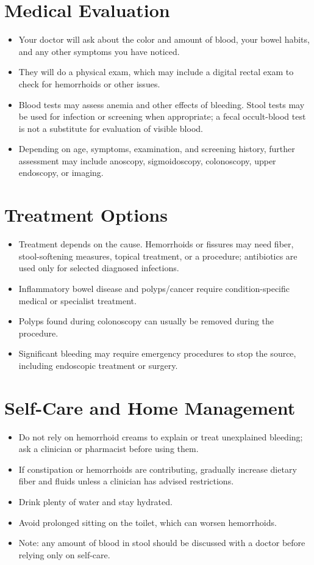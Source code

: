 \section*{Medical Evaluation}
\begin{itemize}
  \item Your doctor will ask about the color and amount of blood, your bowel habits, and any other symptoms you have noticed.
  \item They will do a physical exam, which may include a digital rectal exam to check for hemorrhoids or other issues.
  \item Blood tests may assess anemia and other effects of bleeding. Stool tests may be used for infection or screening when appropriate; a fecal occult-blood test is not a substitute for evaluation of visible blood.
  \item Depending on age, symptoms, examination, and screening history, further assessment may include anoscopy, sigmoidoscopy, colonoscopy, upper endoscopy, or imaging.
\end{itemize}

\section*{Treatment Options}
\begin{itemize}
  \item Treatment depends on the cause. Hemorrhoids or fissures may need fiber, stool-softening measures, topical treatment, or a procedure; antibiotics are used only for selected diagnosed infections.
  \item Inflammatory bowel disease and polyps/cancer require condition-specific medical or specialist treatment.
  \item Polyps found during colonoscopy can usually be removed during the procedure.
  \item Significant bleeding may require emergency procedures to stop the source, including endoscopic treatment or surgery.
\end{itemize}

\section*{Self-Care and Home Management}
\begin{itemize}
  \item Do not rely on hemorrhoid creams to explain or treat unexplained bleeding; ask a clinician or pharmacist before using them.
  \item If constipation or hemorrhoids are contributing, gradually increase dietary fiber and fluids unless a clinician has advised restrictions.
  \item Drink plenty of water and stay hydrated.
  \item Avoid prolonged sitting on the toilet, which can worsen hemorrhoids.
  \item Note: any amount of blood in stool should be discussed with a doctor before relying only on self-care.
\end{itemize}

